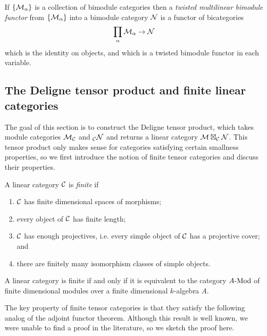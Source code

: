 \documentclass{amsart}
\begin{document}
If $\{ \mathcal M_\alpha \}$ is a collection of bimodule categories then a {\em twisted multilinear bimodule functor} from $\{ \mathcal M_\alpha \}$ into a bimodule category $\mathcal N$ is a functor of bicategories
\begin{equation*}
	\prod_{\alpha} \mathcal M_\alpha \to \mathcal N
\end{equation*}
which is the identity on objects, and which is a twisted bimodule functor in each variable. 

\subsection{The Deligne tensor product and finite linear categories}

The goal of this section is to construct the Deligne tensor product, which takes module categories $\mathcal M_\mathcal C$ and ${}_\mathcal C \mathcal N$ and returns a linear category $\mathcal M \boxtimes_\mathcal C \mathcal N$.  This tensor product only makes sense for categories satisfying certain smallness properties, so we first introduce the notion of finite tensor categories and discuss their properties.

\begin{definition} %
	A linear category $\mathcal C$ is {\em finite} if 
	\begin{enumerate}
		\item $\mathcal C$ has finite dimensional spaces of morphisms;
		\item every object of $\mathcal C$ has finite length;
		\item $\mathcal C$ has enough projectives, i.e. every simple object of $\mathcal C$ has a projective cover; and
		\item there are finitely many isomorphism classes of simple objects.  
	\end{enumerate}
\end{definition}

\begin{remark}
A linear category is finite if and only if it is equivalent to the category $\Mod{A}{}$ of finite dimensional modules over a finite dimensional $k$-algebra $A$.
\end{remark}

The key property of finite tensor categories is that they satisfy the following analog of the adjoint functor theorem.  Although this result is well known, we were unable to find a proof in the literature, so we sketch the proof here.
\end{document}
